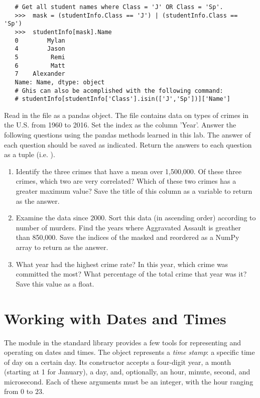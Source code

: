 \begin{lstlisting}
   # Get all student names where Class = 'J' OR Class = 'Sp'.
   >>>  mask = (studentInfo.Class == 'J') | (studentInfo.Class == 'Sp')
   >>>  studentInfo[mask].Name
   0        Mylan
   4        Jason
   5         Remi
   6         Matt
   7    Alexander
   Name: Name, dtype: object
   # Ghis can also be acomplished with the following command:
   # studentInfo[studentInfo['Class'].isin(['J','Sp'])]['Name']
\end{lstlisting}

\begin{problem}\label{prob:rate}
Read in the file  as a pandas object.
The file contains data on types of crimes in the U.S. from 1960 to 2016.
Set the index as the column 'Year'.
Answer the following questions using the pandas methods learned in this lab.
The answer of each question should be saved as indicated.
Return the answers to each question as a tuple (i.e. ).

\begin{enumerate}
	\item Identify the three crimes that have a mean over 1,500,000.
	Of these three crimes, which two are very correlated?
	Which of these two crimes has a greater maximum value?
	Save the title of this column as a variable to return as the answer.
	\item Examine the data since 2000.
	Sort this data (in ascending order) according to number of murders.
	Find the years where Aggravated Assault is greather than 850,000.
   Save the indices of the masked and reordered  as a NumPy array to return as the answer.
	\item What year had the highest crime rate?
	In this year, which crime was committed the most?
	What percentage of the total crime that year was it?
	Save this value as a float.
\end{enumerate}
\end{problem}


\section*{Working with Dates and Times} %

The  module in the standard library provides a few tools for representing and operating on dates and times.
The  object represents a \emph{time stamp}: a specific time of day on a certain day.
Its constructor accepts a four-digit year, a month (starting at 1 for January), a day, and, optionally, an hour, minute, second, and microsecond.
Each of these arguments must be an integer, with the hour ranging from $0$ to $23$.

